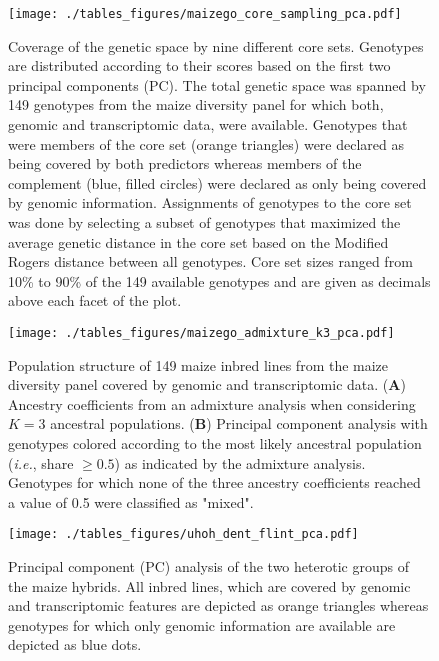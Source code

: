 \documentclass[12pt,titlepage]{article}
\begin{document}
\begin{figure}[H]
\centering
\texttt{[image: ./tables\_figures/maizego\_core\_sampling\_pca.pdf]}
\caption{
  Coverage of the genetic space by nine different core sets. 
  Genotypes are distributed according to their scores based on the first two
  principal components (PC).
  The total genetic space was spanned by 149 genotypes from the maize diversity 
  panel for which both, genomic and transcriptomic data, were available.
  Genotypes that were members of the core set (orange triangles) were declared 
  as being covered by both predictors whereas members of the complement (blue,
  filled circles) were declared as only being covered by genomic information.
  Assignments of genotypes to the core set was done by selecting a subset of
  genotypes that maximized the average genetic distance in the core set based 
  on the Modified Rogers distance between all genotypes.
  Core set sizes ranged from 10\% to 90\% of the 149 available genotypes and
  are given as decimals above each facet of the plot.
}
\label{fig:CoreSetPCA}
\end{figure}


\begin{figure}[H]
\centering
\texttt{[image: ./tables\_figures/maizego\_admixture\_k3\_pca.pdf]}
\caption{
  Population structure of 149 maize inbred lines from the maize diversity panel
  covered by genomic and transcriptomic data.
  (\textbf{A}) Ancestry coefficients from an admixture analysis when 
  considering $K=3$ ancestral populations.
  (\textbf{B}) Principal component analysis with genotypes colored according to 
  the most likely ancestral population (\textit{i.e.}, share $\geq 0.5$) as 
  indicated by the admixture analysis.
  Genotypes for which none of the three ancestry coefficients reached a value
  of 0.5 were classified as "mixed".
}
\label{fig:PopStructure}
\end{figure}


\begin{figure}[H]
\centering
\texttt{[image: ./tables\_figures/uhoh\_dent\_flint\_pca.pdf]}
\caption{
  Principal component (PC) analysis of the two heterotic groups of the maize 
  hybrids.
  All inbred lines, which are covered by genomic and transcriptomic features
  are depicted as orange triangles whereas genotypes for which only genomic
  information are available are depicted as blue dots.
}
\label{fig:UHOH-PCA}
\end{figure}
\end{document}
